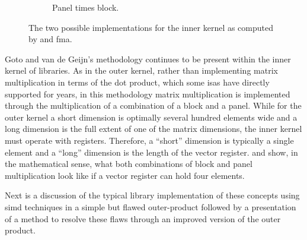 \documentclass[\main/thesis.tex]{subfiles}
\begin{document}
\begin{figure}[t]
\begin{subfigure}{.45\linewidth}
    \caption{Panel times block.}
    \label{fig:gepbSimd}
  \end{subfigure}
  \hfill
  \caption[Inner Kernel Implementations, In Register]{The two possible implementations for the inner kernel as computed by  and \acrshort{fma}.}
  \label{fig:gepb}
  \vspace{-0.15cm}
\end{figure}

Goto and van de Geijn's methodology continues to be present within the inner kernel of libraries.
As in the outer kernel, rather than implementing matrix multiplication in terms of the dot product, which some \glspl{isa} have directly supported for years\footnotemark, in this methodology matrix multiplication is implemented through the multiplication of a combination of a block and a panel.
While for the outer kernel a short dimension is optimally several hundred elements wide and a long dimension is the full extent of one of the matrix dimensions, the inner kernel must operate with registers.
Therefore, a ``short'' dimension is typically a single element and a ``long'' dimension is the length of the vector register.
 and  show, in the mathematical sense, what both combinations of block and panel multiplication look like if a vector register can hold four elements.

Next is a discussion of the typical library implementation of these concepts using \gls{simd} techniques in a simple but flawed outer-product followed by a presentation of a method to resolve these flaws through an improved version of the outer product.
\end{document}
